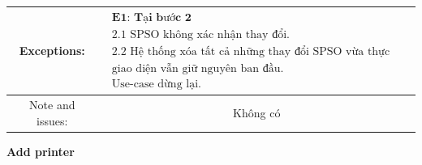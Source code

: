 \begin{tabular}{|c|c|c|c|}
\hline Exceptions: & \multicolumn{3}{|c|}{$\begin{array}{l}
\textbf { E1: Tại bước 2 } \\
\text { 2.1 SPSO không xác nhận thay đổi.} \\
\text { 2.2 Hệ thống xóa tất cả những thay đổi SPSO vừa thực hiện,} \\
\text { giao diện vẫn giữ nguyên ban đầu.} \\
\text { Use-case dừng lại.} 
\text {}\end{array}$} \\
\hline Note and issues: & \multicolumn{3}{|c|}{ Không có } \\
\hline
\end{tabular}

\vspace{1cm}
\textbf{Add printer}\par
